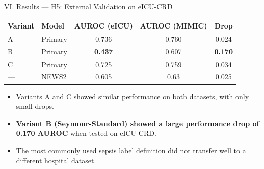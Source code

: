\begin{frame}{VI. Results --- H5: External Validation on
              eICU-CRD~\cite{pollard2018eicu}}
\begin{center}\tablestyle
\begin{tabular}{llccc}
\toprule
\textbf{Variant} & \textbf{Model}
  & \textbf{AUROC (eICU)} & \textbf{AUROC (MIMIC)} & \textbf{Drop} \\
\midrule
A   & Primary & 0.736          & 0.760 & 0.024 \\
B   & Primary & \textbf{0.437} & 0.607 & \textbf{0.170} \\
C   & Primary & 0.725          & 0.759 & 0.034 \\
--- & NEWS2   & 0.605          & 0.63  & 0.025 \\
\bottomrule
\end{tabular}
\end{center}

\vspace{6pt}
\begin{itemize}
  \item Variants A and C showed similar performance on both datasets, with
        only small drops.
  \item \textbf{Variant B (Seymour-Standard) showed a large performance drop
        of 0.170 AUROC} when tested on eICU-CRD.
  \item The most commonly used sepsis label definition did not transfer well
        to a different hospital dataset.
\end{itemize}
\end{frame}


